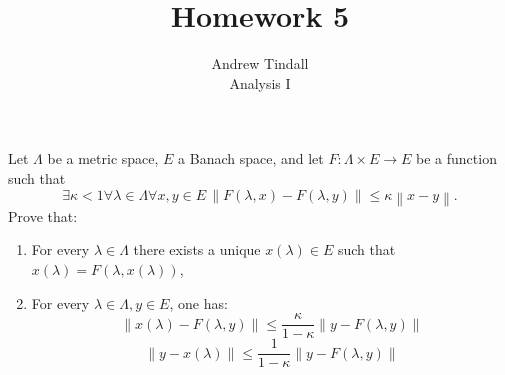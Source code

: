 \documentclass[12pt]{article}
\theoremstyle{definition}
\newenvironment{problem}[2][Problem]{\begin{trivlist}
\item[\hskip \labelsep {\bfseries #1}\hskip \labelsep {\bfseries #2.}]}{\end{trivlist}}
\begin{document}
 
 
\title{Homework 5}
\author{Andrew Tindall\\
Analysis I}
 
\maketitle
\begin{problem}{1}
	Let $\Lambda$ be a metric space, $E$ a Banach space, and let $F : \Lambda \times E \to E$ be a function such that 
	\[ \exists \kappa < 1 \forall \lambda \in \Lambda \forall x,y \in E \, \left \lVert { F(\lambda, x) - F(\lambda, y) } \right \lVert \leq \kappa\left \lVert { x-y } \right \lVert. \]
	Prove that:
	\begin{enumerate}[label=(\roman*)]
		\item For every $\lambda \in \Lambda$ there exists a unique $x(\lambda) \in E$ such that $x(\lambda) = F(\lambda, x(\lambda))$,
		\item For every $\lambda \in \Lambda, y \in E$, one has:
			\[\left \lVert { x(\lambda) - F(\lambda, y) } \right \lVert \leq \frac{\kappa}{1-\kappa} \left \lVert { y - F(\lambda, y) } \right \lVert \]
			\[ \left \lVert {  y - x(\lambda) } \right \lVert  \leq \frac{1}{1-\kappa}\left \lVert { y - F(\lambda, y) } \right \lVert \]
	\end{enumerate}
\end{problem}
\end{document}

